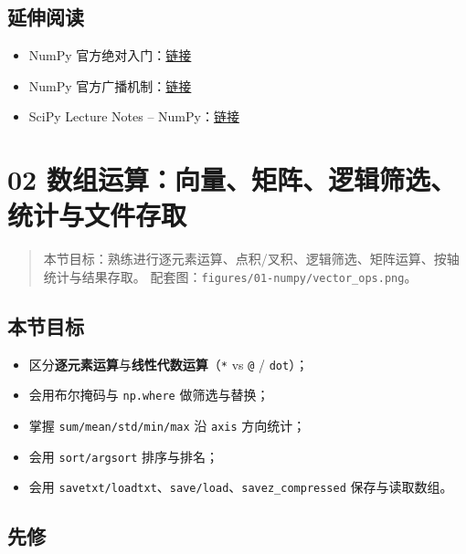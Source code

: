 \subsection{延伸阅读}\label{ux5ef6ux4f38ux9605ux8bfb}

\begin{itemize}
\tightlist
\item
  NumPy
  官方绝对入门：\href{https://numpy.org/doc/stable/user/absolute_beginners.html}{链接}
\item
  NumPy
  官方广播机制：\href{https://numpy.org/doc/stable/user/basics.broadcasting.html}{链接}
\item
  SciPy Lecture Notes --
  NumPy：\href{https://scipy-lectures.org/intro/numpy/index.html}{链接}
\end{itemize}

\section{02
数组运算：向量、矩阵、逻辑筛选、统计与文件存取}\label{ux6570ux7ec4ux8fd0ux7b97ux5411ux91cfux77e9ux9635ux903bux8f91ux7b5bux9009ux7edfux8ba1ux4e0eux6587ux4ef6ux5b58ux53d6}

\begin{quote}
本节目标：熟练进行逐元素运算、点积/叉积、逻辑筛选、矩阵运算、按轴统计与结果存取。
配套图：\texttt{figures/01-numpy/vector\_ops.png}。
\end{quote}

\subsection{本节目标}\label{ux672cux8282ux76eeux6807-8}

\begin{itemize}
\tightlist
\item
  区分\textbf{逐元素运算}与\textbf{线性代数运算}（\texttt{*} vs
  \texttt{@} / \texttt{dot}）；
\item
  会用布尔掩码与 \texttt{np.where} 做筛选与替换；
\item
  掌握 \texttt{sum/mean/std/min/max} 沿 \texttt{axis} 方向统计；
\item
  会用 \texttt{sort/argsort} 排序与排名；
\item
  会用
  \texttt{savetxt/loadtxt}、\texttt{save/load}、\texttt{savez\_compressed}
  保存与读取数组。
\end{itemize}

\subsection{先修}\label{ux5148ux4fee-1}

